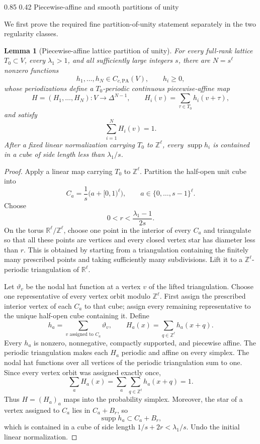\documentclass[11pt,reqno]{amsart}
\makeatletter
\numberwithin{equation}{section}
\renewcommand\subsection{\@startsection{subsection}{2}{\z@}%
  {0.85\baselineskip \@plus 0.25\baselineskip \@minus 0.10\baselineskip}%
  {0.42\baselineskip}%
  {\normalfont\bfseries}}
\newtheorem{lemma}[theorem]{Lemma}
\theoremstyle{definition}
\theoremstyle{remark}
\newcommand{\R}{\mathbb R}
\newcommand{\Z}{\mathbb Z}
\newcommand{\supp}{\operatorname{supp}}
\makeatother
\begin{document}
\subsection{Piecewise-affine and smooth partitions of unity}

We first prove the required fine partition-of-unity statement separately in
the two regularity classes.

\begin{lemma}[Piecewise-affine lattice partition of unity]
\label{lem:pa-source-packets}
For every full-rank lattice $T_0\subset V$, every $\lambda_1>1$, and all
sufficiently large integers $s$, there are $N=s^\ell$ nonzero functions
\[
 h_1,\ldots,h_N\in C_{c,\mathrm{PA}}(V),
 \qquad h_i\ge0,
\]
whose periodizations define a $T_0$-periodic continuous piecewise-affine map
\[
 H=(H_1,\ldots,H_N):V\longrightarrow\Delta^{N-1},
 \qquad
 H_i(v)=\sum_{\tau\in T_0}h_i(v+\tau),
\]
and satisfy
\begin{equation}\label{eq:pa-packet-partition}
 \sum_{i=1}^NH_i(v)=1.
\end{equation}
After a fixed linear normalization carrying $T_0$ to $\Z^\ell$, every
$\supp h_i$ is contained in a cube of side length less than
$\lambda_1/s$.
\end{lemma}

\begin{proof}
Apply a linear map carrying $T_0$ to $\Z^\ell$.  Partition the half-open
unit cube into
\[
 C_a=\frac1s\bigl(a+[0,1)^\ell\bigr),
 \qquad a\in\{0,\ldots,s-1\}^\ell.
\]
Choose
\[
 0<r<\frac{\lambda_1-1}{2s}.
\]
On the torus $\R^\ell/\Z^\ell$, choose one point in the interior of every
$C_a$ and triangulate so that all these points are vertices and every closed
vertex star has diameter less than $r$.  This is obtained by starting from a
triangulation containing the finitely many prescribed points and taking
sufficiently many subdivisions.  Lift it to a $\Z^\ell$-periodic
triangulation of $\R^\ell$.

Let $\vartheta_v$ be the nodal hat function at a vertex $v$ of the lifted
triangulation.  Choose one representative of every vertex orbit modulo
$\Z^\ell$.  First assign the prescribed interior vertex of each $C_a$ to
that cube; assign every remaining representative to the unique half-open
cube containing it.  Define
\[
 h_a=\sum_{v\text{ assigned to }C_a}\vartheta_v,
 \qquad
 H_a(x)=\sum_{q\in\Z^\ell}h_a(x+q).
\]
Every $h_a$ is nonzero, nonnegative, compactly supported, and piecewise
affine.  The periodic triangulation makes each $H_a$ periodic and affine on
every simplex.  The nodal hat functions over all vertices of the periodic
triangulation sum to one.  Since every vertex orbit was assigned exactly
once,
\[
 \sum_aH_a(x)=\sum_a\sum_{q\in\Z^\ell}h_a(x+q)=1.
\]
Thus $H=(H_a)_a$ maps into the probability simplex.  Moreover, the star of a
vertex assigned to $C_a$ lies in $C_a+B_r$, so
\[
 \supp h_a\subset C_a+B_r,
\]
which is contained in a cube of side length
$1/s+2r<\lambda_1/s$.  Undo the initial linear normalization.
\end{proof}
\end{document}
